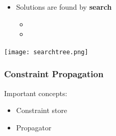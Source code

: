 \documentclass{beamer}
\begin{document}
\begin{frame}
  \begin{minipage}{0.6\textwidth}
    \begin{itemize}
    \item Solutions are found by \textbf{search}
      \begin{itemize}
      \item {}
      \item {}
      \end{itemize}
    \end{itemize}
  \end{minipage}
  \begin{minipage}{0.15\textwidth}
    \texttt{[image: searchtree.png]}
  \end{minipage}
  
\end{frame}



\begin{frame}
  \frametitle{Constraint Propagation}
  Important concepts:
  \begin{itemize}
    \item Constraint store
    \item Propagator
  \end{itemize}
\end{frame}
\end{document}
